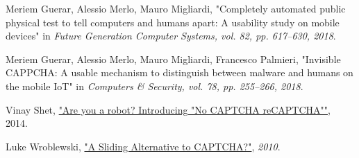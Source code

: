 \begin{thebibliography}{9}
Meriem Guerar, Alessio Merlo, Mauro Migliardi, "Completely automated public physical test to tell computers and humans apart: A usability study on mobile devices" in \emph{Future Generation Computer Systems, vol. 82, pp. 617–630, 2018}.

Meriem Guerar, Alessio Merlo, Mauro Migliardi, Francesco Palmieri, "Invisible CAPPCHA: A usable mechanism to distinguish between malware and humans on the mobile IoT" in \emph{Computers \& Security, vol. 78, pp. 255–266, 2018}.

Vinay Shet, \href{https://security.googleblog.com/2014/12/are-you-robot-introducing-no-captcha.html}{"Are you a robot? Introducing "No CAPTCHA reCAPTCHA""}, 2014.

Luke Wroblewski, \href{https://www.lukew.com/ff/entry.asp?1138}{"A Sliding Alternative to CAPTCHA?"}, \emph{2010}.


\end{thebibliography}
